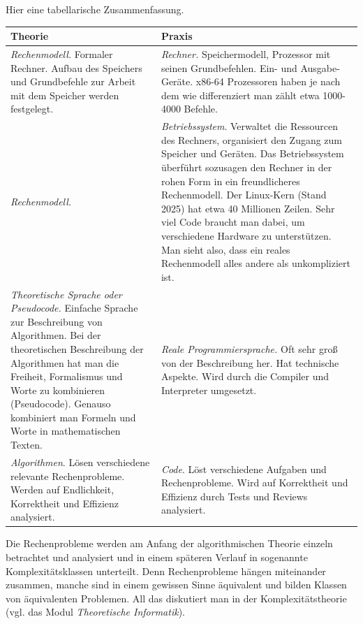 \begin{bem} Hier eine tabellarische Zusammenfassung. 
\begin{center} 
\begin{tabular}{|p{}|p{}|}
	\hline
	\textbf{Theorie} & \textbf{Praxis} \\
	\hline
	\emph{Rechenmodell.} Formaler Rechner. Aufbau des Speichers und Grundbefehle zur Arbeit mit dem Speicher werden festgelegt. &
	\emph{Rechner.} Speichermodell, Prozessor mit seinen Grundbefehlen. Ein- und Ausgabe-Geräte. x86-64 Prozessoren haben je nach dem wie differenziert man zählt etwa 1000-4000 Befehle. \\
	\hline
	\emph{Rechenmodell.} & \emph{Betriebssystem}. Verwaltet die Ressourcen des Rechners, organisiert den Zugang zum Speicher und Geräten. Das Betriebssystem überführt sozusagen den Rechner in der rohen Form in ein freundlicheres Rechenmodell. Der Linux-Kern (Stand 2025) hat etwa 40 Millionen Zeilen. Sehr viel Code braucht man dabei, um verschiedene Hardware zu unterstützen. Man sieht also, dass ein reales Rechenmodell alles andere als unkompliziert ist. 
	\\
	\hline
	\emph{Theoretische Sprache oder Pseudocode.} Einfache Sprache zur Beschreibung von Algorithmen. Bei der theoretischen Beschreibung der Algorithmen hat man die Freiheit, Formalismus und Worte zu kombinieren (Pseudocode). Genauso kombiniert man Formeln und Worte in mathematischen Texten. & \emph{Reale Programmiersprache.} Oft sehr groß von der Beschreibung her. Hat technische Aspekte. Wird durch die Compiler und Interpreter umgesetzt. 
	\\ 
	\hline 
	\emph{Algorithmen}. Lösen verschiedene relevante Rechenprobleme. Werden auf Endlichkeit, Korrektheit und Effizienz analysiert. 
	& 
	\emph{Code}. Löst verschiedene Aufgaben und Rechenprobleme. Wird auf Korrektheit und Effizienz durch Tests und Reviews analysiert. 
	\\
	\hline 
\end{tabular}
\end{center} 

Die Rechenprobleme werden am Anfang der algorithmischen Theorie einzeln betrachtet und analysiert und in einem späteren Verlauf in sogenannte Komplexitätsklassen unterteilt. Denn Rechenprobleme hängen miteinander zusammen, manche sind in einem gewissen Sinne äquivalent und bilden Klassen von äquivalenten Problemen. All das diskutiert man in der Komplexitätstheorie (vgl. das Modul \emph{Theoretische Informatik}). 
\end{bem} 



